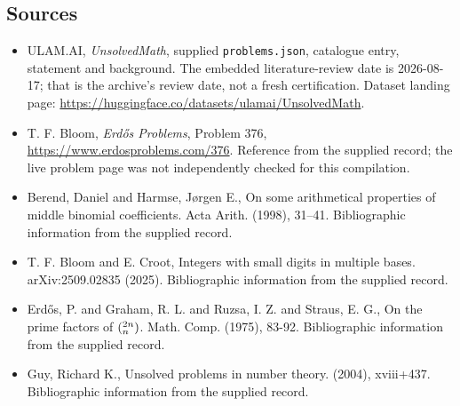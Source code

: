 \documentclass[11pt,a4paper]{article}
\begin{document}
\subsection{Sources}

{\small

\begin{itemize}

\item[\hypertarget{source:statement:1}{S1}] ULAM.AI, \emph{UnsolvedMath}, supplied \texttt{problems.json}, catalogue entry, statement and background. The embedded literature-review date is 2026-08-17; that is the archive’s review date, not a fresh certification. Dataset landing page: \url{https://huggingface.co/datasets/ulamai/UnsolvedMath}.

\item[\hypertarget{source:statement:2}{S2}] T. F. Bloom, \emph{Erdős Problems}, Problem 376, \url{https://www.erdosproblems.com/376}. Reference from the supplied record; the live problem page was not independently checked for this compilation.

\item[\hypertarget{source:statement:3}{S3}] Berend, Daniel and Harmse, J\o rgen E., On some arithmetical properties of middle binomial coefficients. Acta Arith. (1998), 31--41. Bibliographic information from the supplied record.

\item[\hypertarget{source:statement:4}{S4}] T. F. Bloom and E. Croot, Integers with small digits in multiple bases. arXiv:2509.02835 (2025). Bibliographic information from the supplied record.

\item[\hypertarget{source:statement:5}{S5}] Erd\H{o}s, P. and Graham, R. L. and Ruzsa, I. Z. and Straus, E. G., On the prime factors of $(\sp{2n}\sb{n})$. Math. Comp. (1975), 83-92. Bibliographic information from the supplied record.

\item[\hypertarget{source:statement:6}{S6}] Guy, Richard K., Unsolved problems in number theory. (2004), xviii+437. Bibliographic information from the supplied record.

\end{itemize}

}

\label{end:statement}
\end{document}
